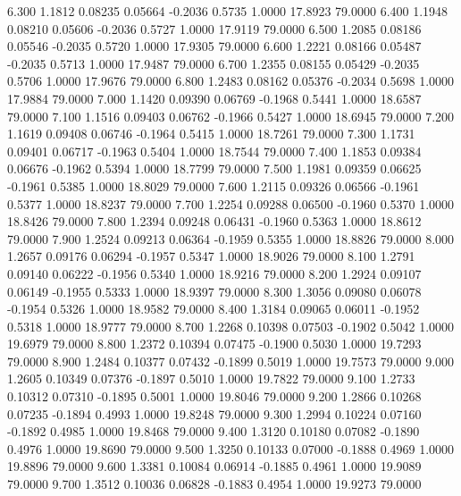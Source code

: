    6.300   1.1812   0.08235   0.05664  -0.2036   0.5735   1.0000  17.8923  79.0000
   6.400   1.1948   0.08210   0.05606  -0.2036   0.5727   1.0000  17.9119  79.0000
   6.500   1.2085   0.08186   0.05546  -0.2035   0.5720   1.0000  17.9305  79.0000
   6.600   1.2221   0.08166   0.05487  -0.2035   0.5713   1.0000  17.9487  79.0000
   6.700   1.2355   0.08155   0.05429  -0.2035   0.5706   1.0000  17.9676  79.0000
   6.800   1.2483   0.08162   0.05376  -0.2034   0.5698   1.0000  17.9884  79.0000
   7.000   1.1420   0.09390   0.06769  -0.1968   0.5441   1.0000  18.6587  79.0000
   7.100   1.1516   0.09403   0.06762  -0.1966   0.5427   1.0000  18.6945  79.0000
   7.200   1.1619   0.09408   0.06746  -0.1964   0.5415   1.0000  18.7261  79.0000
   7.300   1.1731   0.09401   0.06717  -0.1963   0.5404   1.0000  18.7544  79.0000
   7.400   1.1853   0.09384   0.06676  -0.1962   0.5394   1.0000  18.7799  79.0000
   7.500   1.1981   0.09359   0.06625  -0.1961   0.5385   1.0000  18.8029  79.0000
   7.600   1.2115   0.09326   0.06566  -0.1961   0.5377   1.0000  18.8237  79.0000
   7.700   1.2254   0.09288   0.06500  -0.1960   0.5370   1.0000  18.8426  79.0000
   7.800   1.2394   0.09248   0.06431  -0.1960   0.5363   1.0000  18.8612  79.0000
   7.900   1.2524   0.09213   0.06364  -0.1959   0.5355   1.0000  18.8826  79.0000
   8.000   1.2657   0.09176   0.06294  -0.1957   0.5347   1.0000  18.9026  79.0000
   8.100   1.2791   0.09140   0.06222  -0.1956   0.5340   1.0000  18.9216  79.0000
   8.200   1.2924   0.09107   0.06149  -0.1955   0.5333   1.0000  18.9397  79.0000
   8.300   1.3056   0.09080   0.06078  -0.1954   0.5326   1.0000  18.9582  79.0000
   8.400   1.3184   0.09065   0.06011  -0.1952   0.5318   1.0000  18.9777  79.0000
   8.700   1.2268   0.10398   0.07503  -0.1902   0.5042   1.0000  19.6979  79.0000
   8.800   1.2372   0.10394   0.07475  -0.1900   0.5030   1.0000  19.7293  79.0000
   8.900   1.2484   0.10377   0.07432  -0.1899   0.5019   1.0000  19.7573  79.0000
   9.000   1.2605   0.10349   0.07376  -0.1897   0.5010   1.0000  19.7822  79.0000
   9.100   1.2733   0.10312   0.07310  -0.1895   0.5001   1.0000  19.8046  79.0000
   9.200   1.2866   0.10268   0.07235  -0.1894   0.4993   1.0000  19.8248  79.0000
   9.300   1.2994   0.10224   0.07160  -0.1892   0.4985   1.0000  19.8468  79.0000
   9.400   1.3120   0.10180   0.07082  -0.1890   0.4976   1.0000  19.8690  79.0000
   9.500   1.3250   0.10133   0.07000  -0.1888   0.4969   1.0000  19.8896  79.0000
   9.600   1.3381   0.10084   0.06914  -0.1885   0.4961   1.0000  19.9089  79.0000
   9.700   1.3512   0.10036   0.06828  -0.1883   0.4954   1.0000  19.9273  79.0000
